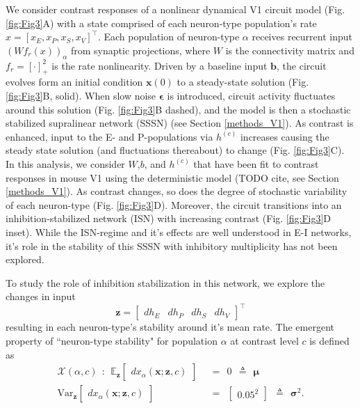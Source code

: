 \documentclass[11pt]{article}
\begin{document}
We consider contrast responses of a nonlinear dynamical V1 circuit model (Fig. \ref{fig:Fig3}A) with a state comprised of each neuron-type population's rate $x = \left[x_E, x_P , x_S, x_V \right]^\top$.
Each population of neuron-type $\alpha$ receives recurrent input $\left(W f_r(x)\right)_\alpha$ from synaptic projections, where $W$ is the connectivity matrix and $f_r = \left[\cdot\right]_+^2$ is the rate nonlinearity.
Driven by a baseline input $\mathbf{b}$, the circuit evolves form an initial condition $\mathbf{x}(0)$ to a steady-state solution (Fig. \ref{fig:Fig3}B, solid).
When slow noise $\mathbf{\epsilon}$ is introduced, circuit activity fluctuates around this solution (Fig. \ref{fig:Fig3}B dashed), and the model is then a stochastic stabilized supralinear network (SSSN) \cite{hennequin2018dynamical} (see Section \ref{methods_V1}).
As contrast is enhanced, input to the E- and P-populations via $h^{(c)}$ increases causing the steady state solution (and fluctuations thereabout) to change  (Fig. \ref{fig:Fig3}C).
In this analysis, we consider $W$,$b$, and $h^{(c)}$ that have been fit to contrast responses in mouse V1 using the deterministic model (TODO cite, see Section \ref{methods_V1}).
As contrast changes, so does the degree of stochastic variability of each neuron-type (Fig. \ref{fig:Fig3}D).
Moreover, the circuit transitions into an inhibition-stabilized network (ISN) with increasing contrast (Fig. \ref{fig:Fig3}D inset).
While the ISN-regime and it's effects are well understood in E-I networks, it's role in the stability of this SSSN with inhibitory multiplicity has not been explored.

To study the role of inhibition stabilization in this network, we explore the changes in input 
\begin{equation}
\mathbf{z} = \begin{bmatrix} dh_E & dh_P & dh_S & dh_V \end{bmatrix}^{\top}
\end{equation}
resulting in each neuron-type's stability around it's mean rate.
The emergent property of ``neuron-type stability" for population $\alpha$  at contrast level $c$ is defined as 
\begin{equation}\label{eq:EP}
\begin{split}
\mathcal{X}(\alpha, c) ~~:~~  \mathbb{E}_{\mathbf{z}}\begin{bmatrix} dx_\alpha(\mathbf{x}; \mathbf{z},c) \end{bmatrix}  &~~=~~  0  ~~\triangleq~~ \bm{\mu}  \\ 
\text{Var}_{\mathbf{z}}\begin{bmatrix} dx_\alpha(\mathbf{x}; \mathbf{z},c) \end{bmatrix}  &~~=~~  \begin{bmatrix} 0.05^2 \end{bmatrix} ~~\triangleq~~ \bm{\sigma}^2 .
\end{split}
\end{equation}
\end{document}
